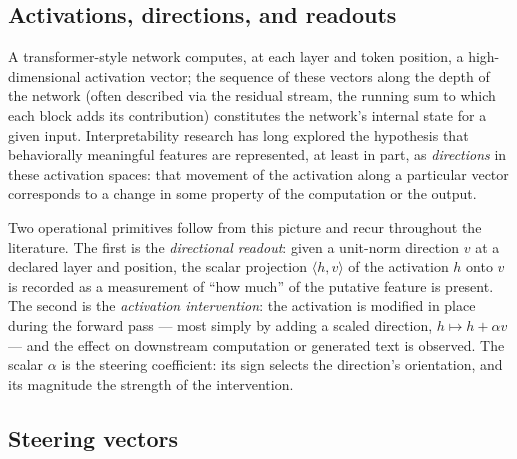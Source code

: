 \subsection{Activations, directions, and readouts}\label{ch02:steering:setting}

A transformer-style network computes, at each layer and token position, a high-dimensional activation vector; the sequence of these vectors along the depth of the network (often described via the residual stream, the running sum to which each block adds its contribution) constitutes the network's internal state for a given input. Interpretability research has long explored the hypothesis that behaviorally meaningful features are represented, at least in part, as \emph{directions} in these activation spaces: that movement of the activation along a particular vector corresponds to a change in some property of the computation or the output.

Two operational primitives follow from this picture and recur throughout the literature. The first is the \emph{directional readout}: given a unit-norm direction $v$ at a declared layer and position, the scalar projection $\langle h, v \rangle$ of the activation $h$ onto $v$ is recorded as a measurement of ``how much'' of the putative feature is present. The second is the \emph{activation intervention}: the activation is modified in place during the forward pass --- most simply by adding a scaled direction, $h \mapsto h + \alpha v$ --- and the effect on downstream computation or generated text is observed. The scalar $\alpha$ is the steering coefficient: its sign selects the direction's orientation, and its magnitude the strength of the intervention.

\subsection{Steering vectors}\label{ch02:steering:vectors}

